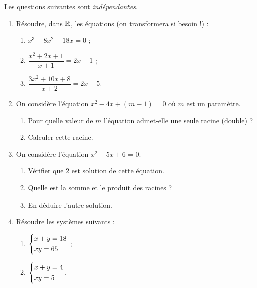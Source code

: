 \documentclass[a4paper,11pt]{article}
\begin{document}
\medskip


\medskip

Les questions suivantes sont \textit{indépendantes}.
\begin{enumerate}
	\item Résoudre, dans $\R$, les équations (on transformera si besoin !) :
	\begin{enumerate}
		\item $x^3-8x^2+18x=0$ ;
		\item $\dfrac{x^2+2x+1}{x+1}=2x-1$ ;
		\item $\dfrac{3x^2+10x+8}{x+2}=2x+5$.
	\end{enumerate}
	\item On considère l'équation $x^2-4x+(m-1)=0$ où $m$ est un paramètre.
	\begin{enumerate}
		\item Pour quelle valeur de $m$ l'équation admet-elle une seule racine (double) ?
		\item Calculer cette racine.
	\end{enumerate}
%		
	\item On considère l'équation $x^2-5x+6=0$.
	\begin{enumerate}
		\item Vérifier que 2 est solution de cette équation.
		\item Quelle est la somme et le produit des racines ?
		\item En déduire l'autre solution.
	\end{enumerate}
	\item Résoudre les systèmes suivants :
	\begin{enumerate}
		\item $\begin{dcases} x+y=18 \\xy=65 \end{dcases}$ ;
		\item $\begin{dcases} x+y=4 \\xy=5 \end{dcases}$.
	\end{enumerate}
\end{enumerate}
\end{document}
